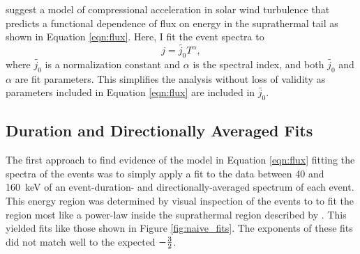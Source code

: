 \documentclass[letterpaper,11pt]{article}
\begin{document}
\citet{Fisk2008} suggest a model of compressional acceleration in solar wind turbulence that predicts a functional dependence of flux on energy in the suprathermal tail as shown in Equation \ref{eqn:flux}.  Here, I fit the event spectra to
\begin{equation}
j = \tilde{j_0} T^{\alpha},
\label{eqn:fit}
\end{equation}
where $\tilde{j_0}$ is a normalization constant and $\alpha$ is the spectral index, and both $\tilde{j_0}$ and $\alpha$ are fit parameters.  This simplifies the analysis without loss of validity as parameters included in Equation \ref{eqn:flux} are included in $\tilde{j_0}$.

\subsection{Duration and Directionally Averaged Fits}
The first approach to find evidence of the model in Equation \ref{eqn:flux} fitting the spectra of the events was to simply apply a fit to the data between 40 and \SI{160}{\kilo\electronvolt} of an event-duration- and directionally-averaged spectrum of each event.  This energy region was determined by visual inspection of the events to to fit the region most like a power-law inside the suprathermal region described by \citet{Fisk2008}. This yielded fits like those shown in Figure \ref{fig:naive_fits}.  The exponents of these fits did not match well to the expected $-{3 \over 2}$.
\end{document}
